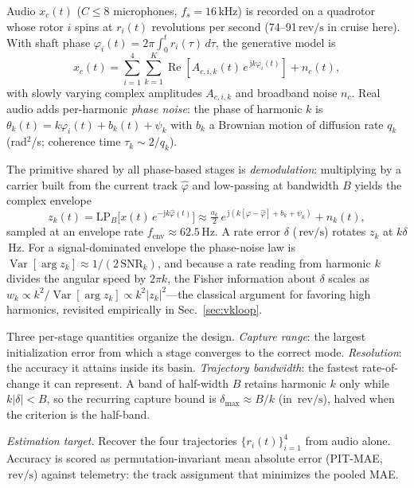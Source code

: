 \documentclass[journal]{IEEEtran}
\newcommand{\revps}{\ensuremath{\,\mathrm{rev/s}}}
\newcommand{\fsenv}{\ensuremath{f_{\mathrm{env}}}}
\newcommand{\snr}{\ensuremath{\mathrm{SNR}}}
\begin{document}
Audio $x_c(t)$ ($C \le 8$ microphones, $f_s = 16$\,kHz) is recorded on a
quadrotor whose rotor $i$ spins at $r_i(t)$ revolutions per second
(74--91\revps{} in cruise here). With shaft phase
$\varphi_i(t) = 2\pi \int_0^t r_i(\tau)\,d\tau$, the generative model is
\begin{equation}
  x_c(t) = \sum_{i=1}^{4} \sum_{k=1}^{K}
  \operatorname{Re}\!\left[ A_{c,i,k}(t)\, e^{\,\mathrm{j} k \varphi_i(t)}
  \right] + n_c(t),
  \label{eq:model}
\end{equation}
with slowly varying complex amplitudes $A_{c,i,k}$ and broadband noise
$n_c$. Real audio adds per-harmonic \emph{phase noise}: the phase of
harmonic $k$ is $\theta_k(t) = k\varphi_i(t) + b_k(t) + \psi_k$ with
$b_k$ a Brownian motion of diffusion rate $q_k$ (rad$^2$/s; coherence
time $\tau_k \sim 2/q_k$).

The primitive shared by all phase-based stages is \emph{demodulation}:
multiplying by a carrier built from the current track $\hat\varphi$ and
low-passing at bandwidth $B$ yields the complex envelope
\begin{equation}
  z_k(t) = \mathrm{LP}_B\!\big[ x(t)\, e^{-\mathrm{j} k \hat\varphi(t)}
  \big] \approx \tfrac{a_k}{2}\,
  e^{\,\mathrm{j}(k[\varphi-\hat\varphi] + b_k + \psi_k)} + n_k(t),
  \label{eq:envelope}
\end{equation}
sampled at an envelope rate $\fsenv \approx 62.5$\,Hz. A rate error
$\delta$ (\revps) rotates $z_k$ at $k\delta$\,Hz. For a signal-dominated
envelope the phase-noise law is
$\operatorname{Var}[\arg z_k] \approx 1/(2\,\snr_k)$, and because a rate
reading from harmonic $k$ divides the angular speed by $2\pi k$, the
Fisher information about $\delta$ scales as
$w_k \propto k^2 / \operatorname{Var}[\arg z_k] \propto k^2 |z_k|^2$---the
classical argument for favoring high harmonics, revisited empirically in
Sec.~\ref{sec:vkloop}.

Three per-stage quantities organize the design. \emph{Capture range}: the
largest initialization error from which a stage converges to the correct
mode. \emph{Resolution}: the accuracy it attains inside its basin.
\emph{Trajectory bandwidth}: the fastest rate-of-change it can represent.
A band of half-width $B$ retains harmonic $k$ only while $k|\delta| < B$,
so the recurring capture bound is $\delta_{\max} \approx B/k$ (in \revps),
halved when the criterion is the half-band.

\emph{Estimation target.} Recover the four trajectories
$\{r_i(t)\}_{i=1}^4$ from audio alone. Accuracy is scored as
permutation-invariant mean absolute error (PIT-MAE, \revps) against
telemetry: the track assignment that minimizes the pooled MAE.
\end{document}
